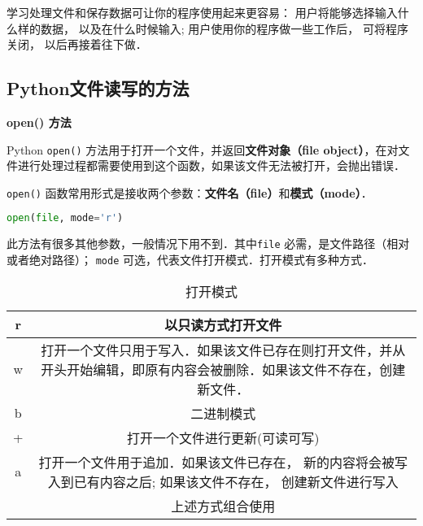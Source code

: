 

学习处理文件和保存数据可让你的程序使用起来更容易： 用户将能够选择输入什么样的数据， 以及在什么时候输入; 用户使用你的程序做一些工作后， 可将程序关闭， 以后再接着往下做．

\subsection{Python文件读写的方法}
\textbf{open() 方法}

Python \verb|open()| 方法用于打开一个文件，并返回\textbf{文件对象（file object）}，在对文件进行处理过程都需要使用到这个函数，如果该文件无法被打开，会抛出错误．

\verb|open()| 函数常用形式是接收两个参数：\textbf{文件名（file）}和\textbf{模式（mode）}．
\begin{lstlisting}[language=python]
open(file, mode='r')
\end{lstlisting}
此方法有很多其他参数，一般情况下用不到．其中\verb|file| 必需，是文件路径（相对或者绝对路径）； \verb|mode| 可选，代表文件打开模式．打开模式有多种方式．
\begin{table}[ht]
\centering
\caption{打开模式}\label{PyFile_tab1}
\begin{tabular}{|c|c|}
\hline
r & 以只读方式打开文件 \\
\hline
w & 打开一个文件只用于写入．如果该文件已存在则打开文件，并从开头开始编辑，即原有内容会被删除．如果该文件不存在，创建新文件． \\
\hline
b & 二进制模式 \\
\hline
+ & 打开一个文件进行更新(可读可写) \\
\hline
a & 打开一个文件用于追加．如果该文件已存在， 新的内容将会被写入到已有内容之后; 如果该文件不存在， 创建新文件进行写入 \\
\hline
&上述方式组合使用   \\
\hline
\end{tabular}
\end{table}

